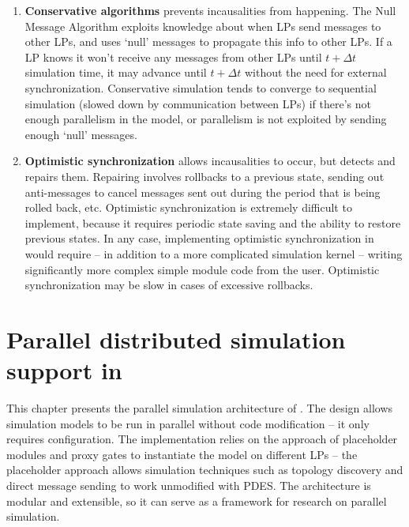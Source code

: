 \begin{enumerate}
  \item{\textbf{Conservative algorithms}
    prevents incausalities from happening. The Null Message Algorithm
    exploits knowledge about when LPs send messages to other LPs,
    and uses `null' messages to propagate this info to other LPs.
    If a LP knows it won't receive any messages from other
    LPs until $t+\Delta t$ simulation time, it may advance until
    $t+\Delta t$ without the need for external synchronization.
    Conservative simulation tends to converge to sequential simulation
    (slowed down by communication between LPs) if there's not
    enough parallelism in the model, or parallelism is not exploited
    by sending enough `null' messages.}

  \item{\textbf{Optimistic synchronization}
    allows incausalities to occur, but detects and
    repairs them. Repairing involves rollbacks to a previous state,
    sending out anti-messages to cancel messages sent out during the
    period that is being rolled back, etc.  Optimistic synchronization
    is extremely difficult to implement, because it requires periodic
    state saving and the ability to restore previous states. In any
    case, implementing optimistic synchronization in {\opp} would
    require -- in addition to a more complicated simulation kernel --
    writing significantly more complex simple
    module code from the user.  Optimistic synchronization may be slow
    in cases of excessive rollbacks.}
\end{enumerate}


\section{Parallel distributed simulation support in {\opp}}

This chapter presents the parallel simulation architecture
of {\opp}. The design allows simulation models to be run
in parallel without code modification -- it only requires configuration.
The implementation relies on the approach of placeholder modules
and proxy gates to instantiate the model on different LPs --
the placeholder approach allows simulation techniques such as
topology discovery and direct message sending to work unmodified with
PDES. The architecture is modular and extensible, so it can
serve as a framework for research on parallel simulation.

